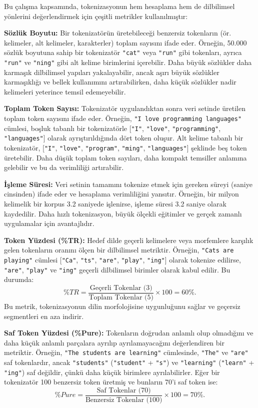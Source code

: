 \documentclass{article}
\begin{document}
Bu çalışma kapsamında, tokenizasyonun hem hesaplama hem de dilbilimsel yönlerini değerlendirmek için çeşitli metrikler kullanılmıştır:

\textbf{Sözlük Boyutu:}  
Bir tokenizatörün üretebileceği benzersiz tokenların (ör. kelimeler, alt kelimeler, karakterler) toplam sayısını ifade eder. Örneğin, 50.000 sözlük boyutuna sahip bir tokenizatör \texttt{"cat"} veya \texttt{"run"} gibi tokenları, ayrıca \texttt{"run"} ve \texttt{"ning"} gibi alt kelime birimlerini içerebilir. Daha büyük sözlükler daha karmaşık dilbilimsel yapıları yakalayabilir, ancak aşırı büyük sözlükler karmaşıklığı ve bellek kullanımını artırabilirken, daha küçük sözlükler nadir kelimeleri yeterince temsil edemeyebilir.

\textbf{Toplam Token Sayısı:}  
Tokenizatör uygulandıktan sonra veri setinde üretilen toplam token sayısını ifade eder. Örneğin, \texttt{"I love programming languages"} cümlesi, boşluk tabanlı bir tokenizatörle [\texttt{"I"}, \texttt{"love"}, \texttt{"programming"}, \texttt{"languages"}] olarak ayrıştırıldığında dört token oluşur. Alt kelime tabanlı bir tokenizatör, [\texttt{"I"}, \texttt{"love"}, \texttt{"program"}, \texttt{"ming"}, \texttt{"languages"}] şeklinde beş token üretebilir. Daha düşük toplam token sayıları, daha kompakt temsiller anlamına gelebilir ve bu da verimliliği artırabilir.

\textbf{İşleme Süresi:}  
Veri setinin tamamını tokenize etmek için gereken süreyi (saniye cinsinden) ifade eder ve hesaplama verimliliğini yansıtır. Örneğin, bir milyon kelimelik bir korpus 3.2 saniyede işlenirse, işleme süresi 3.2 saniye olarak kaydedilir. Daha hızlı tokenizasyon, büyük ölçekli eğitimler ve gerçek zamanlı uygulamalar için avantajlıdır.

\textbf{Token Yüzdesi (\%TR):}  
Hedef dilde geçerli kelimelere veya morfemlere karşılık gelen tokenların oranını ölçen bir dilbilimsel metriktir. Örneğin, \texttt{"Cats are playing"} cümlesi [\texttt{"Ca"}, \texttt{"ts"}, \texttt{"are"}, \texttt{"play"}, \texttt{"ing"}] olarak tokenize edilirse, \texttt{"are"}, \texttt{"play"} ve \texttt{"ing"} geçerli dilbilimsel birimler olarak kabul edilir. Bu durumda:  
\[
\%TR = \frac{\text{Geçerli Tokenlar (3)}}{\text{Toplam Tokenlar (5)}} \times 100 = 60\%.
\]
Bu metrik, tokenizasyonun dilin morfolojisine uygunluğunu sağlar ve geçersiz segmentleri en aza indirir.

\textbf{Saf Token Yüzdesi (\%Pure):}  
Tokenların doğrudan anlamlı olup olmadığını ve daha küçük anlamlı parçalara ayrılıp ayrılamayacağını değerlendiren bir metriktir. Örneğin, \texttt{"The students are learning"} cümlesinde, \texttt{"The"} ve \texttt{"are"} saf tokenlardır, ancak \texttt{"students"} (\texttt{"student"} + \texttt{"s"}) ve \texttt{"learning"} (\texttt{"learn"} + \texttt{"ing"}) saf değildir, çünkü daha küçük birimlere ayrılabilirler. Eğer bir tokenizatör 100 benzersiz token üretmiş ve bunların 70’i saf token ise:  
\[
\%Pure = \frac{\text{Saf Tokenlar (70)}}{\text{Benzersiz Tokenlar (100)}} \times 100 = 70\%.
\]
\end{document}
